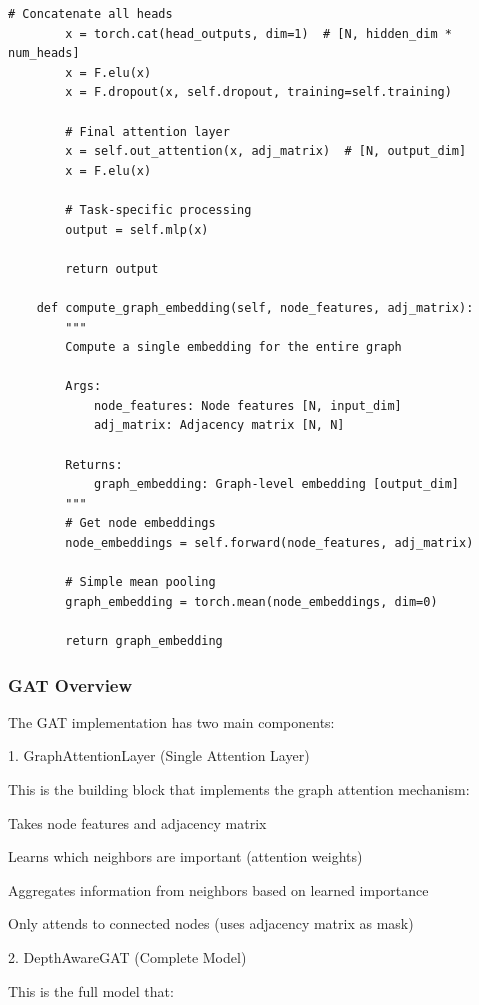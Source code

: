 \begin{lstlisting}[style=pythonstyle,title={Basic Gat Code},label={code:basic_gat}]
        # Concatenate all heads
        x = torch.cat(head_outputs, dim=1)  # [N, hidden_dim * num_heads]
        x = F.elu(x)
        x = F.dropout(x, self.dropout, training=self.training)
        
        # Final attention layer
        x = self.out_attention(x, adj_matrix)  # [N, output_dim]
        x = F.elu(x)
        
        # Task-specific processing
        output = self.mlp(x)
        
        return output
    
    def compute_graph_embedding(self, node_features, adj_matrix):
        """
        Compute a single embedding for the entire graph
        
        Args:
            node_features: Node features [N, input_dim]
            adj_matrix: Adjacency matrix [N, N]
            
        Returns:
            graph_embedding: Graph-level embedding [output_dim]
        """
        # Get node embeddings
        node_embeddings = self.forward(node_features, adj_matrix)
        
        # Simple mean pooling
        graph_embedding = torch.mean(node_embeddings, dim=0)
        
        return graph_embedding
\end{lstlisting}

\subsubsection{GAT Overview}
The GAT implementation has two main components:

1. GraphAttentionLayer (Single Attention Layer)

This is the building block that implements the graph attention mechanism:

\begin{compactitem}
   \item Takes node features and adjacency matrix
   \item Learns which neighbors are important (attention weights)
   \item Aggregates information from neighbors based on learned importance
   \item Only attends to connected nodes (uses adjacency matrix as mask)
\end{compactitem}

2. DepthAwareGAT (Complete Model)

This is the full model that:

